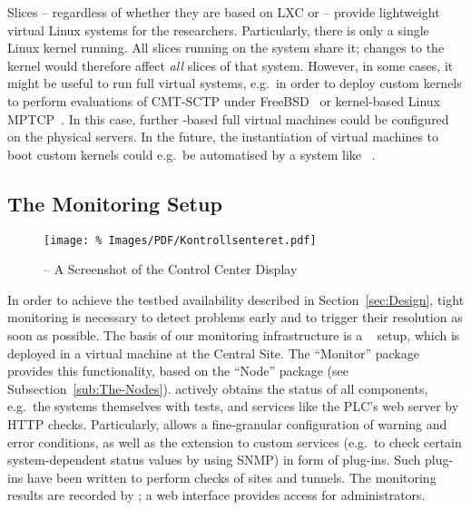 Slices -- regardless of whether they are based on LXC or  -- provide lightweight virtual Linux systems for the researchers. Particularly, there is only a single Linux kernel running. All slices running on the system share it; changes to the kernel would therefore affect \emph{all} slices of that system. However, in some cases, it might be useful to run full virtual systems, e.g.\ in order to deploy custom kernels to perform evaluations of CMT-SCTP under FreeBSD~\cite{Dre2012,PAMS2012} or kernel-based Linux MPTCP~\cite{RBP+11}. In this case, further -based full virtual machines could be configured on the physical servers. In the future, the instantiation of virtual machines to boot custom kernels could e.g.\ be automatised by a system like ~\cite{SHG+11}.


\subsection{The Monitoring Setup}
\label{sub:The-Monitoring-Setup}

\begin{figure*}
\begin{center}
\texttt{[image: \%
   Images/PDF/Kontrollsenteret.pdf]}
\end{center}
\caption{ -- A Screenshot of the Control Center Display}
\label{cap:Kontrollsenteret}
\end{figure*}

In order to achieve the testbed availability described in Section~\ref{sec:Design}, tight monitoring is necessary to detect problems early and to trigger their resolution as soon as possible. The basis of our monitoring infrastructure is a ~\cite{NagiosCoreDocumentation} setup, which is deployed in a virtual machine at the Central Site. The ``Monitor'' package provides this functionality, based on the ``Node'' package (see Subsection~\ref{sub:The-Nodes}).  actively obtains the status of all components, e.g.\ the systems themselves with  tests, and services like the PLC's web server by HTTP checks. Particularly,  allows a fine-granular configuration of warning and error conditions, as well as the extension to custom services (e.g.\ to check certain system-dependent status values by using SNMP) in form of plug-ins. Such plug-ins have been written to perform checks of sites and tunnels. The monitoring results are recorded by ; a web interface provides access for administrators.

